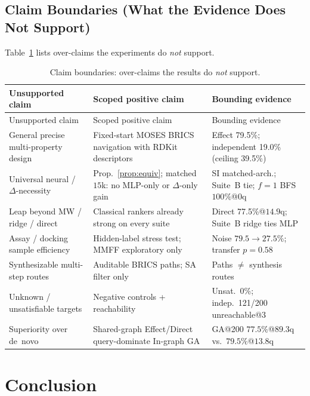 \documentclass[journal=jcisd8,manuscript=article,email=false]{achemso}
\begin{document}
\subsection{Claim Boundaries (What the Evidence Does Not Support)}
\label{sec:claims}

Table~\ref{tab:claims} lists over-claims the experiments do \emph{not} support.

{\footnotesize
\setlength{\tabcolsep}{3pt}
\begin{longtable}{@{}>{\raggedright\arraybackslash}p{}>{\raggedright\arraybackslash}p{}>{\raggedright\arraybackslash}p{}@{}}
\caption{Claim boundaries: over-claims the results do \emph{not} support.}
\label{tab:claims}\\
\toprule
Unsupported claim & Scoped positive claim & Bounding evidence \\
\midrule
\endfirsthead
\toprule
Unsupported claim & Scoped positive claim & Bounding evidence \\
\midrule
\endhead
\bottomrule
\endlastfoot
General precise multi-property design &
Fixed-start MOSES BRICS navigation with RDKit descriptors &
Effect 79.5\%; independent 19.0\% (ceiling 39.5\%) \\
Universal neural / $\Delta$-necessity &
Prop.~\ref{prop:equiv}; matched $15$k: no MLP-only or $\Delta$-only gain &
SI matched-arch.; Suite~B tie; $f{=}1$ BFS $100\%$@$0$q \\
Leap beyond MW / ridge / direct &
Classical rankers already strong on every suite &
Direct 77.5\%@$14.9$q; Suite~B ridge ties MLP \\
Assay / docking sample efficiency &
Hidden-label stress test; MMFF exploratory only &
Noise $79.5{\to}27.5\%$; transfer $p{=}0.58$ \\
Synthesizable multi-step routes &
Auditable BRICS paths; SA filter only &
Paths $\neq$ synthesis routes \\
Unknown / unsatisfiable targets &
Negative controls + reachability &
Unsat.\ 0\%; indep.\ 121/200 unreachable@3 \\
Superiority over de~novo &
Shared-graph Effect/Direct query-dominate In-graph GA &
GA@200 $77.5\%$@$89.3$q vs.\ $79.5\%$@$13.8$q \\
\end{longtable}
}
\FloatBarrier

\section{Conclusion}
\end{document}

